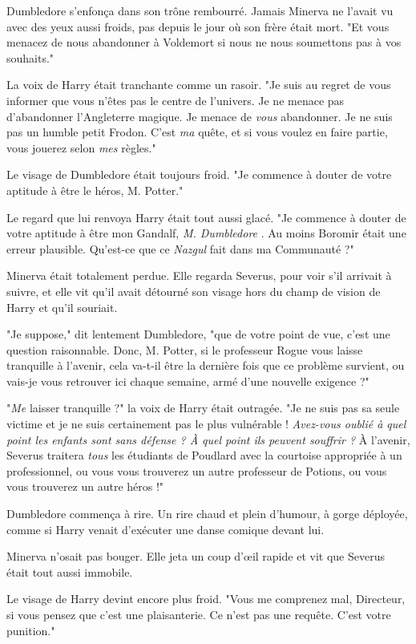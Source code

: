 Dumbledore s'enfonça dans son trône rembourré. Jamais Minerva ne l'avait vu avec des yeux aussi froids, pas depuis le jour où son frère était mort. "Et vous menacez de nous abandonner à Voldemort si nous ne nous soumettons pas à vos souhaits."

La voix de Harry était tranchante comme un rasoir. "Je suis au regret de vous informer que vous n'êtes pas le centre de l'univers. Je ne menace pas d'abandonner l'Angleterre magique. Je menace de \emph{vous}  abandonner. Je ne suis pas un humble petit Frodon. C'est \emph{ma } quête, et si vous voulez en faire partie, vous jouerez selon \emph{mes}  règles."

Le visage de Dumbledore était toujours froid. "Je commence à douter de votre aptitude à être le héros, M. Potter."

Le regard que lui renvoya Harry était tout aussi glacé. "Je commence à douter de votre aptitude à être mon Gandalf, \emph{M. Dumbledore} . Au moins Boromir était une erreur plausible. Qu'est-ce que ce \emph{Nazgul}  fait dans ma Communauté ?"

Minerva était totalement perdue. Elle regarda Severus, pour voir s'il arrivait à suivre, et elle vit qu'il avait détourné son visage hors du champ de vision de Harry et qu'il souriait.

"Je suppose," dit lentement Dumbledore, "que de votre point de vue, c'est une question raisonnable. Donc, M. Potter, si le professeur Rogue vous laisse tranquille à l'avenir, cela va-t-il être la dernière fois que ce problème survient, ou vais-je vous retrouver ici chaque semaine, armé d'une nouvelle exigence ?"

"\emph{Me}  laisser tranquille ?" la voix de Harry était outragée. "Je ne suis pas sa seule victime et je ne suis certainement pas le plus vulnérable ! \emph{Avez-vous oublié à quel point les enfants sont sans défense ? À quel point ils peuvent souffrir ?}  À l'avenir, Severus traitera \emph{tous}  les étudiants de Poudlard avec la courtoise appropriée à un professionnel, ou vous vous trouverez un autre professeur de Potions, ou vous vous trouverez un autre héros !"

Dumbledore commença à rire. Un rire chaud et plein d'humour, à gorge déployée, comme si Harry venait d'exécuter une danse comique devant lui.

Minerva n'osait pas bouger. Elle jeta un coup d'œil rapide et vit que Severus était tout aussi immobile.

Le visage de Harry devint encore plus froid. "Vous me comprenez mal, Directeur, si vous pensez que c'est une plaisanterie. Ce n'est pas une requête. C'est votre punition."

